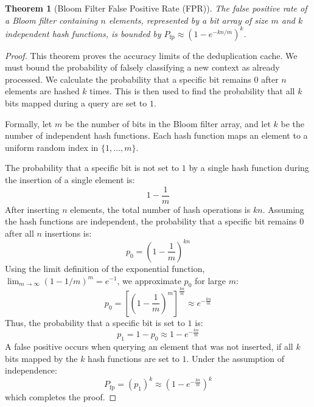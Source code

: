 \documentclass[11pt,a4paper]{article}
\theoremstyle{plain}
\newtheorem{theorem}{Theorem}[section]
\theoremstyle{definition}
\theoremstyle{remark}
\begin{document}
\begin{theorem}[Bloom Filter False Positive Rate (FPR)]\label{thm:bloom}
The false positive rate of a Bloom filter containing $n$ elements, represented by a bit array of size $m$ and $k$ independent hash functions, is bounded by $P_{\mathrm{fp}} \approx (1 - e^{-kn/m})^k$.
\end{theorem}
\begin{proof}
This theorem proves the accuracy limits of the deduplication cache. We must bound the probability of falsely classifying a new context as already processed. We calculate the probability that a specific bit remains $0$ after $n$ elements are hashed $k$ times. This is then used to find the probability that all $k$ bits mapped during a query are set to $1$.

Formally, let $m$ be the number of bits in the Bloom filter array, and let $k$ be the number of independent hash functions. Each hash function maps an element to a uniform random index in $\{1,\dots,m\}$. 

The probability that a specific bit is not set to $1$ by a single hash function during the insertion of a single element is:
$$1 - \frac{1}{m}$$
After inserting $n$ elements, the total number of hash operations is $kn$. Assuming the hash functions are independent, the probability that a specific bit remains $0$ after all $n$ insertions is:
$$p_0 = \left( 1 - \frac{1}{m} \right)^{kn}$$
Using the limit definition of the exponential function, $\lim_{m \to \infty} (1 - 1/m)^m = e^{-1}$, we approximate $p_0$ for large $m$:
$$p_0 = \left[ \left( 1 - \frac{1}{m} \right)^m \right]^{\frac{kn}{m}} \approx e^{-\frac{kn}{m}}$$
Thus, the probability that a specific bit is set to $1$ is:
$$p_1 = 1 - p_0 \approx 1 - e^{-\frac{kn}{m}}$$
A false positive occurs when querying an element that was not inserted, if all $k$ bits mapped by the $k$ hash functions are set to $1$. Under the assumption of independence:
$$P_{\mathrm{fp}} = (p_1)^k \approx \left( 1 - e^{-\frac{kn}{m}} \right)^k$$
which completes the proof.
\end{proof}
\end{document}
